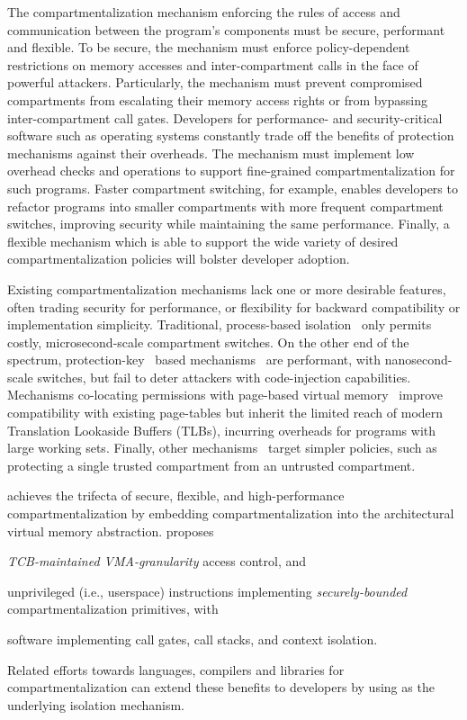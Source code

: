 The compartmentalization mechanism enforcing
the rules of access and communication between the program's 
components must be secure, performant and flexible.
To be secure, the mechanism must enforce policy-dependent 
restrictions on memory accesses and inter-compartment calls
in the face of powerful attackers.
Particularly, the mechanism must prevent compromised compartments
from escalating their memory access rights or from bypassing
inter-compartment call gates.
%
Developers for performance- and security-critical software such as
operating systems constantly trade off the benefits of protection mechanisms
against their overheads.
The mechanism must implement low overhead checks and operations to support 
fine-grained compartmentalization for such programs.
Faster compartment switching, for example, 
enables developers to refactor programs into smaller compartments
with more frequent compartment switches,
improving security while maintaining the same performance.
%
Finally, a flexible mechanism which is able to support the wide variety of 
desired compartmentalization policies will bolster developer adoption.

Existing compartmentalization mechanisms lack one or more 
desirable features, often trading security for performance,
or flexibility for backward compatibility or implementation simplicity.
Traditional, process-based 
isolation~\cite{KleinEHACDEEKNSTW09,LittonVE0BD16,WitchelCA02MMP}
only permits costly, microsecond-scale compartment switches.
On the other end of the spectrum, protection-key~\cite{guide2011intel} based 
mechanisms~\cite{ParkLXMK19,ERIMOberwagner19,SchrammelWSS0MG20Donky}
are performant, with nanosecond-scale switches,
but fail to deter attackers with code-injection capabilities.
Mechanisms co-locating permissions with page-based virtual 
memory~\cite{ERIMOberwagner19,SchrammelWSS0MG20Donky,LeeSK18,DuHXZC19XPC,
KoningCBGA17,HedayatiGJCSSM19Hodor}
improve compatibility with existing page-tables but
inherit the limited reach of modern 
Translation Lookaside Buffers (TLBs), incurring overheads
for programs with large working sets.
Finally, other mechanisms~\cite{KoningCBGA17,FrassettoJLS18} 
target simpler policies, 
such as protecting a single trusted compartment from an untrusted 
compartment.

\seccells achieves the trifecta of secure, flexible, and high-performance 
compartmentalization by embedding compartmentalization into the 
architectural virtual memory abstraction.
\seccells proposes 
\begin{inparaenum}
\item \emph{TCB-maintained VMA-granularity} access control, and 
\item unprivileged (i.e., userspace) instructions implementing 
\emph{securely-bounded} compartmentalization primitives, with
\item software implementing call gates, call stacks, and context isolation.
\end{inparaenum}
Related efforts towards languages, compilers and libraries for
compartmentalization can extend these benefits to developers
by using \seccells as the underlying isolation mechanism.


